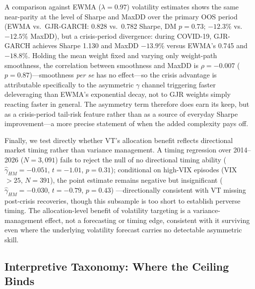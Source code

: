 A comparison against EWMA ($\lambda=0.97$) volatility estimates shows the same near-parity at the level of Sharpe and MaxDD over the primary OOS period (EWMA vs.\ GJR-GARCH: 0.828 vs.\ 0.782 Sharpe, DM $p=0.73$; $-12.3\%$ vs.\ $-12.5\%$ MaxDD), but a crisis-period divergence: during COVID-19, GJR-GARCH achieves Sharpe 1.130 and MaxDD $-13.9\%$ versus EWMA's 0.745 and $-18.8\%$. Holding the mean weight fixed and varying only weight-path smoothness, the correlation between smoothness and MaxDD is $\rho=-0.007$ ($p=0.87$)---smoothness \emph{per se} has no effect---so the crisis advantage is attributable specifically to the asymmetric $\gamma$ channel triggering faster deleveraging than EWMA's exponential decay, not to GJR weights simply reacting faster in general. The asymmetry term therefore does earn its keep, but as a crisis-period tail-risk feature rather than as a source of everyday Sharpe improvement---a more precise statement of when the added complexity pays off.

Finally, we test directly whether VT's allocation benefit reflects directional market timing rather than variance management. A \citet{henriksson1981} timing regression over 2014--2026 ($N=3{,}091$) fails to reject the null of no directional timing ability ($\hat{\gamma}_{HM}=-0.051$, $t=-1.01$, $p=0.31$);%
 conditional on high-VIX episodes (VIX $>25$, $N=391$), the point estimate remains negative but insignificant ($\hat{\gamma}_{HM}=-0.030$, $t=-0.79$, $p=0.43$)%
---directionally consistent with VT missing post-crisis recoveries, though this subsample is too short to establish perverse timing. The allocation-level benefit of volatility targeting is a variance-management effect, not a forecasting or timing edge, consistent with it surviving even where the underlying volatility forecast carries no detectable asymmetric skill.

\subsection{Interpretive Taxonomy: Where the Ceiling Binds}
\label{sec:interpretive_taxonomy}

